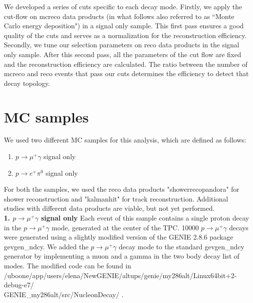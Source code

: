 \documentclass[a4paper, 10pt]{article}
\begin{document}
We developed a series of cuts specific to each decay mode. Firstly, we apply the cut-flow on  mcreco data products (in what follows also referred to as ``Monte Carlo energy deposition") in a signal only sample.  This first pass ensures a good quality of the cuts and serves as a normalization for the reconstruction efficiency. Secondly, we tune our selection parameters on reco data products in the signal only sample.  After this second pass, all the parameters of the cut flow are fixed and the reconstruction efficiency are calculated. The ratio between the number of mcreco and reco events  that pass our cuts determines the efficiency to detect that decay topology.\\


\section{MC samples}
We used two different MC samples for this analysis, which are defined as follows:
\begin{enumerate}[topsep=10pt,itemsep=-1ex,partopsep=10pt,parsep=1ex]
\item $p \rightarrow \mu^{+} \gamma$  signal only
\item  $p \rightarrow e^{+} \pi^{0}$ signal only
\end{enumerate}

For both the samples, we used the reco data products "showerrecopandora" for shower reconstruction and "kalmanhit" for track reconstruction. Additional studies with different data products are viable, but not  yet performed.\\
 
{\bf 1. $p \rightarrow \mu^{+} \gamma$   signal only} Each event of this sample contains a single proton decay in the $p \rightarrow \mu^{+} \gamma$  mode, generated at the center of the TPC.
10000 $p \rightarrow \mu^{+} \gamma$  decays were generated using a slightly modified version of the GENIE 2.8.6 package gevgen\_ndcy. We added the  $p \rightarrow \mu^{+} \gamma$ decay mode to the standard gevgen\_ndcy generator by implementing a muon and a gamma in the two body decay list  of modes. The modified code can be found in 
/uboone/app/users/elena/NewGENIE/altups/genie/my286alt/Linux64bit+2-debug-e7/\\GENIE\_my286alt/src/NucleonDecay/ .
\end{document}
